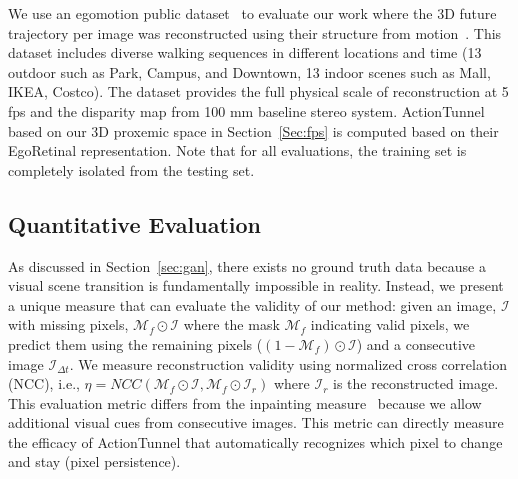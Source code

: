 \documentclass[10pt,twocolumn,letterpaper]{article}
\begin{document}
We use an egomotion public dataset~\cite{park:2016_future} to evaluate our work where the 3D future trajectory per image was reconstructed using their structure from motion~\cite{hartley:2004}. This dataset includes diverse walking sequences in different locations and time (13 outdoor such as Park, Campus, and Downtown, 13 indoor scenes such as Mall, IKEA, Costco). The dataset provides the full physical scale of reconstruction at 5 fps and the disparity map from 100 mm baseline stereo system. ActionTunnel based on our 3D proxemic space in Section~\ref{Sec:fps} is computed based on their EgoRetinal representation. Note that for all evaluations, the training set is completely isolated from the testing set.




\subsection{Quantitative Evaluation} \label{Sec:quant}
As discussed in Section~\ref{sec:gan}, there exists no ground truth data because a visual scene transition is fundamentally impossible in reality. Instead, we present a unique measure that can evaluate the validity of our method: given an image, $\mathcal{I}$ with missing pixels, $\mathcal{M}_f\odot \mathcal{I}$ where the mask $\mathcal{M}_f$ indicating valid pixels, we predict them using the remaining pixels ($(1-\mathcal{M}_f) \odot \mathcal{I}$) and a consecutive image $\mathcal{I}_{\Delta t}$. We measure reconstruction validity using normalized cross correlation (NCC), i.e., $\eta = NCC(\mathcal{M}_f\odot \mathcal{I}, \mathcal{M}_f \odot \mathcal{I}_r)$ where $\mathcal{I}_r$ is the reconstructed image. This evaluation metric differs from the inpainting measure~\cite{pathakCVPR16context} because we allow additional visual cues from consecutive images. This metric can directly measure the efficacy of ActionTunnel that automatically recognizes which pixel to change and stay (pixel persistence). 
\end{document}
